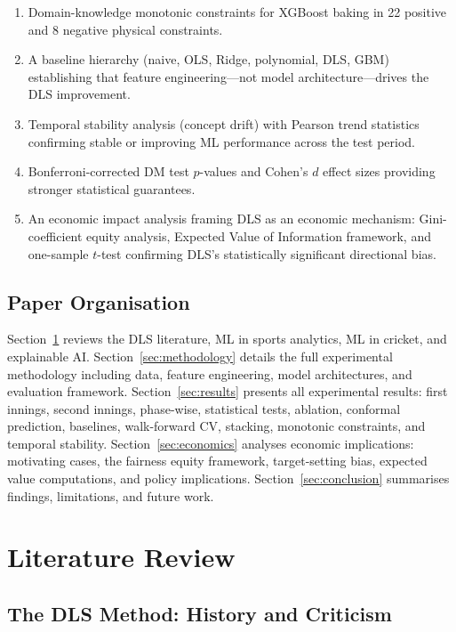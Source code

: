 \documentclass[10pt,a4paper,twocolumn]{article}
\begin{document}
\begin{enumerate}[leftmargin=1.2em]
\item Domain-knowledge monotonic constraints for XGBoost baking in 22 positive and 8 negative physical constraints.
\item A baseline hierarchy (naive, OLS, Ridge, polynomial, DLS, GBM) establishing that feature engineering---not model architecture---drives the DLS improvement.
\item Temporal stability analysis (concept drift) with Pearson trend statistics confirming stable or improving ML performance across the test period.
\item Bonferroni-corrected DM test $p$-values and Cohen's $d$ effect sizes providing stronger statistical guarantees.
\item An economic impact analysis framing DLS as an economic mechanism: Gini-coefficient equity analysis, Expected Value of Information framework, and one-sample $t$-test confirming DLS's statistically significant directional bias.
\end{enumerate}

\subsection{Paper Organisation}

Section~\ref{sec:litrev} reviews the DLS literature, ML in sports analytics, ML in cricket, and explainable AI. Section~\ref{sec:methodology} details the full experimental methodology including data, feature engineering, model architectures, and evaluation framework. Section~\ref{sec:results} presents all experimental results: first innings, second innings, phase-wise, statistical tests, ablation, conformal prediction, baselines, walk-forward CV, stacking, monotonic constraints, and temporal stability. Section~\ref{sec:economics} analyses economic implications: motivating cases, the fairness equity framework, target-setting bias, expected value computations, and policy implications. Section~\ref{sec:conclusion} summarises findings, limitations, and future work.

\section{Literature Review}
\label{sec:litrev}

\subsection{The DLS Method: History and Criticism}
\end{document}
